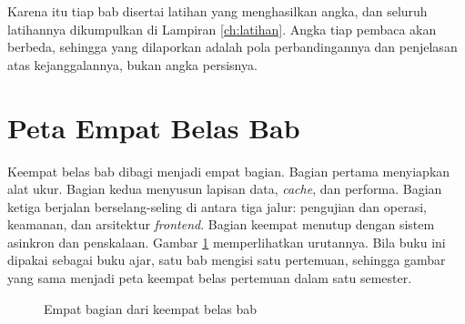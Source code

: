 Karena itu tiap bab disertai latihan yang menghasilkan angka, dan seluruh
latihannya dikumpulkan di Lampiran \ref{ch:latihan}. Angka tiap pembaca akan
berbeda, sehingga yang dilaporkan adalah pola perbandingannya dan penjelasan
atas kejanggalannya, bukan angka persisnya.

\section{Peta Empat Belas Bab}

Keempat belas bab dibagi menjadi empat bagian. Bagian pertama
menyiapkan alat ukur. Bagian kedua menyusun lapisan data, \textit{cache}, dan
performa. Bagian ketiga berjalan berselang-seling di antara tiga jalur:
pengujian dan operasi, keamanan, dan arsitektur \textit{frontend}. Bagian
keempat menutup dengan sistem asinkron dan penskalaan. Gambar
\ref{fig:peta01} memperlihatkan urutannya. Bila buku ini dipakai sebagai
buku ajar, satu bab mengisi satu pertemuan, sehingga gambar yang sama
menjadi peta keempat belas pertemuan dalam satu semester.

\begin{figure}[!htb]
  \centering
  \caption{Empat bagian dari keempat belas bab}
  \label{fig:peta01}
\end{figure}

